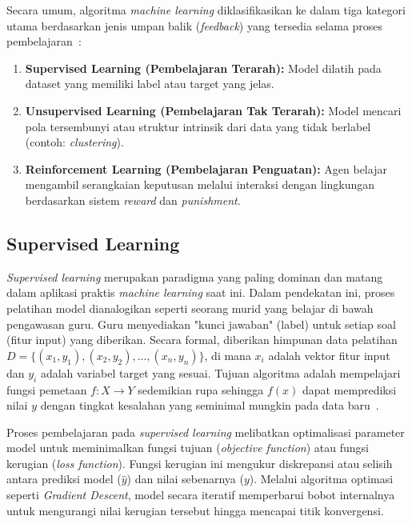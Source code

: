 Secara umum, algoritma \textit{machine learning} diklasifikasikan ke dalam tiga
kategori utama berdasarkan jenis umpan balik (\textit{feedback}) yang tersedia
selama proses pembelajaran~\cite{Chapelle2006SemiSupervised,
Cunningham2008Supervised, Sutton2005Reinforcement}:

\begin{enumerate}
  \item \textbf{Supervised Learning (Pembelajaran Terarah):} Model dilatih pada
    dataset yang memiliki label atau target yang jelas.
  \item \textbf{Unsupervised Learning (Pembelajaran Tak Terarah):} Model mencari
    pola tersembunyi atau struktur intrinsik dari data yang tidak berlabel
    (contoh: \textit{clustering}).
  \item \textbf{Reinforcement Learning (Pembelajaran Penguatan):} Agen belajar
    mengambil serangkaian keputusan melalui interaksi dengan lingkungan
    berdasarkan sistem \textit{reward} dan \textit{punishment}.
\end{enumerate}

\subsection{Supervised Learning}

\textit{Supervised learning} merupakan paradigma yang paling dominan dan matang
dalam aplikasi praktis \textit{machine learning} saat ini.
Dalam pendekatan ini, proses pelatihan model dianalogikan seperti seorang murid
yang belajar di bawah pengawasan guru.
Guru menyediakan "kunci jawaban" (label) untuk setiap soal (fitur input)
yang diberikan.
Secara formal, diberikan himpunan data pelatihan $D = \{(x_1, y_1),
(x_2, y_2), ..., (x_n, y_n)\}$,
di mana $x_i$ adalah vektor fitur input dan $y_i$ adalah variabel
target yang sesuai.
Tujuan algoritma adalah mempelajari fungsi pemetaan $f: X \to Y$ sedemikian rupa
sehingga $f(x)$ dapat memprediksi nilai $y$ dengan tingkat kesalahan yang
seminimal mungkin pada data baru~\cite{Cunningham2008Supervised}.

Proses pembelajaran pada \textit{supervised learning} melibatkan optimalisasi
parameter model untuk meminimalkan fungsi tujuan (\textit{objective function})
atau fungsi kerugian (\textit{loss function}).
Fungsi kerugian ini mengukur diskrepansi atau selisih antara prediksi
model ($\hat{y}$)
dan nilai sebenarnya ($y$).
Melalui algoritma optimasi seperti \textit{Gradient Descent}, model
secara iteratif
memperbarui bobot internalnya untuk mengurangi nilai kerugian
tersebut hingga mencapai
titik konvergensi.

